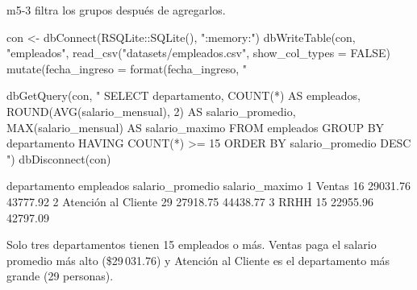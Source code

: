 \begin{solucion}{m5-3}
 filtra los grupos después de agregarlos.

\begin{rcode}
con <- dbConnect(RSQLite::SQLite(), ":memory:")
dbWriteTable(con, "empleados",
             read_csv("datasets/empleados.csv", show_col_types = FALSE) %
               mutate(fecha_ingreso = format(fecha_ingreso, "%

dbGetQuery(con, "
  SELECT departamento,
         COUNT(*)                       AS empleados,
         ROUND(AVG(salario_mensual), 2) AS salario_promedio,
         MAX(salario_mensual)           AS salario_maximo
  FROM empleados
  GROUP BY departamento
  HAVING COUNT(*) >= 15
  ORDER BY salario_promedio DESC
")
dbDisconnect(con)
\end{rcode}

\begin{rsalida}
         departamento empleados salario_promedio salario_maximo
1              Ventas        16         29031.76       43777.92
2 Atención al Cliente        29         27918.75       44438.77
3                RRHH        15         22955.96       42797.09
\end{rsalida}

Solo tres departamentos tienen 15 empleados o más. Ventas paga el salario
promedio más alto (\$29\,031.76) y Atención al Cliente es el departamento
más grande (29 personas).
\end{solucion}

